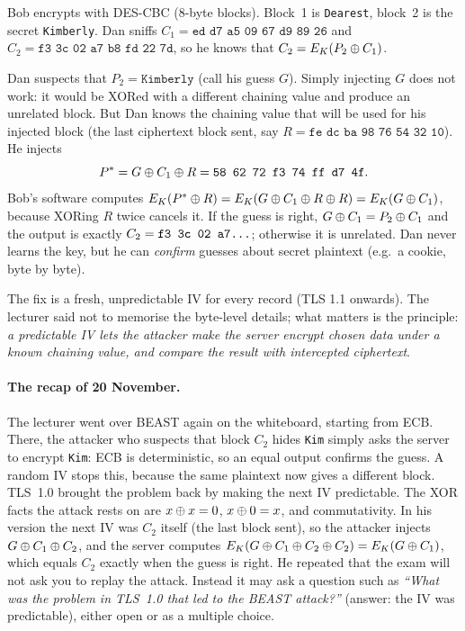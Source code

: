 \begin{example}
Bob encrypts with DES-CBC (8-byte blocks). Block~1 is \texttt{Dearest}, block~2 is the secret \texttt{Kimberly}. Dan sniffs $C_1 = \texttt{ed d7 a5 09 67 d9 89 26}$ and $C_2 = \texttt{f3 3c 02 a7 b8 fd 22 7d}$, so he knows that $C_2 = E_K(P_2 \oplus C_1)$.

Dan suspects that $P_2 = \texttt{Kimberly}$ (call his guess $G$). Simply injecting $G$ does not work: it would be XORed with a different chaining value and produce an unrelated block. But Dan knows the chaining value that will be used for his injected block (the last ciphertext block sent, say $R = \texttt{fe dc ba 98 76 54 32 10}$). He injects
\[
    P^{*} = G \oplus C_1 \oplus R = \texttt{58 62 72 f3 74 ff d7 4f}.
\]
Bob's software computes $E_K(P^{*} \oplus R) = E_K(G \oplus C_1 \oplus R \oplus R) = E_K(G \oplus C_1)$, because XORing $R$ twice cancels it. If the guess is right, $G \oplus C_1 = P_2 \oplus C_1$ and the output is exactly $C_2 = \texttt{f3 3c 02 a7\dots}$; otherwise it is unrelated. Dan never learns the key, but he can \emph{confirm} guesses about secret plaintext (e.g.\ a cookie, byte by byte).
\end{example}

The fix is a fresh, unpredictable IV for every record (TLS 1.1 onwards). The lecturer said not to memorise the byte-level details; what matters is the principle: \emph{a predictable IV lets the attacker make the server encrypt chosen data under a known chaining value, and compare the result with intercepted ciphertext}.

\paragraph{The recap of 20 November.} The lecturer went over BEAST again on the whiteboard, starting from ECB. There, the attacker who suspects that block $C_2$ hides \texttt{Kim} simply asks the server to encrypt \texttt{Kim}: ECB is deterministic, so an equal output confirms the guess. A random IV stops this, because the same plaintext now gives a different block. TLS~1.0 brought the problem back by making the next IV predictable. The XOR facts the attack rests on are $x \oplus x = 0$, $x \oplus 0 = x$, and commutativity. In his version the next IV was $C_2$ itself (the last block sent), so the attacker injects $G \oplus C_1 \oplus C_2$, and the server computes $E_K(G \oplus C_1 \oplus C_2 \oplus C_2) = E_K(G \oplus C_1)$, which equals $C_2$ exactly when the guess is right. He repeated that the exam will not ask you to replay the attack. Instead it may ask a question such as \emph{\enquote{What was the problem in TLS~1.0 that led to the BEAST attack?}} (answer: the IV was predictable), either open or as a multiple choice.

